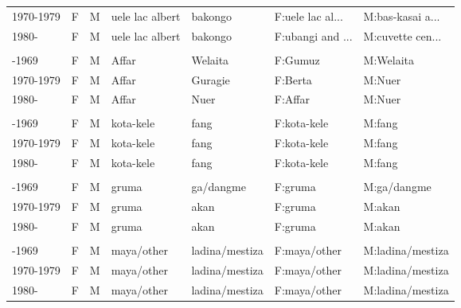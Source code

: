 \begin{ThreePartTable}
\begin{longtable}[t]{lllllll}
\hspace{1em}1970-1979 & F & M & uele lac albert & bakongo & F:uele lac al... & M:bas-kasai a...\\
\hspace{1em}1980- & F & M & uele lac albert & bakongo & F:ubangi and ... & M:cuvette cen...\\
\addlinespace[0.3em]
\multicolumn{7}{l}{\textbf{Ethiopia}}\\
\hspace{1em}-1969 & F & M & Affar & Welaita & F:Gumuz & M:Welaita\\
\hspace{1em}1970-1979 & F & M & Affar & Guragie & F:Berta & M:Nuer\\
\hspace{1em}1980- & F & M & Affar & Nuer & F:Affar & M:Nuer\\
\addlinespace[0.3em]
\multicolumn{7}{l}{\textbf{Gabon}}\\
\hspace{1em}-1969 & F & M & kota-kele & fang & F:kota-kele & M:fang\\
\hspace{1em}1970-1979 & F & M & kota-kele & fang & F:kota-kele & M:fang\\
\hspace{1em}1980- & F & M & kota-kele & fang & F:kota-kele & M:fang\\
\addlinespace[0.3em]
\multicolumn{7}{l}{\textbf{Ghana}}\\
\hspace{1em}-1969 & F & M & gruma & ga/dangme & F:gruma & M:ga/dangme\\
\hspace{1em}1970-1979 & F & M & gruma & akan & F:gruma & M:akan\\
\hspace{1em}1980- & F & M & gruma & akan & F:gruma & M:akan\\
\addlinespace[0.3em]
\multicolumn{7}{l}{\textbf{Guatemala}}\\
\hspace{1em}-1969 & F & M & maya/other & ladina/mestiza & F:maya/other & M:ladina/mestiza\\
\hspace{1em}1970-1979 & F & M & maya/other & ladina/mestiza & F:maya/other & M:ladina/mestiza\\
\hspace{1em}1980- & F & M & maya/other & ladina/mestiza & F:maya/other & M:ladina/mestiza\\

\end{longtable}
\end{ThreePartTable}
